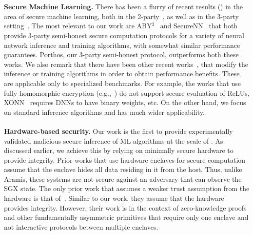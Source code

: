 \\\\
\noindent\textbf{Secure Machine Learning.} There has been a flurry of recent results (\cite{sml1,codedprivateml,sml3,sml4,chiron}) in the area of secure machine learning, both in the 2-party~\cite{shafindss,valeriamatrix,cryptonets,minionn,gazelle,delphi,helen}, as well as in the 3-party setting~\cite{chameleon,aby3,securenn,quantizednn}. The most relevant to our work are ABY$^3$~\cite{aby3} and SecureNN~\cite{securenn} that both provide 3-party semi-honest secure computation protocols for a variety of neural network inference and training algorithms, with somewhat similar performance guarantees. Porthos, our 3-party semi-honest protocol, outperforms both these works. We also remark that there have been other recent works~\cite{xonn,codedprivateml,nitin,outsourcingprivateml,chet,nhe,nhe2,leviosa}, that modify the inference or training algorithms in order to obtain performance benefits.  These are applicable only to specialized benchmarks. For example, the works that use fully homomorphic encryption (e.g.,~\cite{chet,nhe,nhe2})  do not support secure evaluation of ReLUs, XONN~\cite{xonn} requires DNNs to have binary weights, etc.
 On the other hand, we focus on standard inference algorithms and \tool has much wider applicability.
\\\\
\noindent\textbf{Hardware-based security.}  Our work is the first to provide experimentally validated malicious secure inference of ML algorithms at the scale of \resnet. As discussed earlier, we achieve this by relying on minimally secure hardware to provide integrity. Prior works that use hardware enclaves for secure computation~\cite{vc3, obliviousmpml, GuptaFC16, BahmaniFC17,gcsgx,ndss1,ndss2,ndss3,slalom,opaque,chiron} assume that the enclave hides all data residing in it from the host. Thus, unlike Aramis, these systems are not secure against an adversary that can observe the SGX state. 
 The only prior work that assumes a weaker trust assumption from the hardware is that of~\cite{sealedglass}. Similar to our work, they assume that the hardware provides integrity. However, their work is  in the context of zero-knowledge proofs and other fundamentally asymmetric primitives that require only one enclave
and not interactive protocols between multiple enclaves. %
